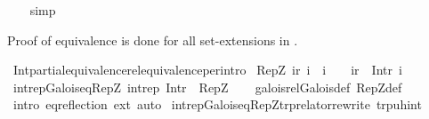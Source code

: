\begin{isabellebody}
%
\isadelimproof
\ \ %
\endisadelimproof
%
\isatagproof
{}\isamarkupfalse%
\ simp%
\endisatagproof
{\isafoldproof}%
%
\isadelimproof
%
\endisadelimproof
%
\begin{isamarkuptext}%
Proof of equivalence is done for all set-extensions in
.%
\end{isamarkuptext}\isamarkuptrue%
\isamarkupfalse%
\ Int{\isachardot}{\kern0pt}partial{\isacharunderscore}{\kern0pt}equivalence{\isacharunderscore}{\kern0pt}rel{\isacharunderscore}{\kern0pt}equivalence{\isacharbrackleft}{\kern0pt}per{\isacharunderscore}{\kern0pt}intro{\isacharbrackright}{\kern0pt}\isanewline
\isanewline
{}\isamarkupfalse%
\ {\isachardoublequoteopen}RepZ\ ir\ i\ {\isasymequiv}\ i\ {\isasymin}\ {\isasymint}\ {\isasymand}\ ir\ {\isacharequal}{\kern0pt}\ Int{\isachardot}{\kern0pt}r\ i{\isachardoublequoteclose}\isanewline
\isanewline
{}\isamarkupfalse%
\ int{\isacharunderscore}{\kern0pt}rep{\isacharunderscore}{\kern0pt}Galois{\isacharunderscore}{\kern0pt}eq{\isacharunderscore}{\kern0pt}RepZ{\isacharcolon}{\kern0pt}\ {\isachardoublequoteopen}{\isacharparenleft}{\kern0pt}\isactrlbsub {\isacharparenleft}{\kern0pt}{\isacharequal}{\kern0pt}\isactrlbsub int{\isacharunderscore}{\kern0pt}rep\isactrlesub {\isacharparenright}{\kern0pt}\isactrlesub {\isasymlessapprox}\isactrlbsub {\isacharparenleft}{\kern0pt}{\isacharequal}{\kern0pt}\isactrlbsub {\isasymint}\isactrlesub {\isacharparenright}{\kern0pt}\ Int{\isachardot}{\kern0pt}r\isactrlesub {\isacharparenright}{\kern0pt}\ {\isasymequiv}\ RepZ{\isachardoublequoteclose}\isanewline
%
\isadelimproof
\ \ %
\endisadelimproof
%
\isatagproof
{}\isamarkupfalse%
\ galois{\isacharunderscore}{\kern0pt}rel{\isachardot}{\kern0pt}Galois{\isacharunderscore}{\kern0pt}def\ RepZ{\isacharunderscore}{\kern0pt}def\ \isamarkupfalse%
\ {\isacharparenleft}{\kern0pt}intro\ eq{\isacharunderscore}{\kern0pt}reflection\ ext{\isacharparenright}{\kern0pt}\ auto%
\endisatagproof
{\isafoldproof}%
%
\isadelimproof
\isanewline
%
\endisadelimproof
\isanewline
{}\isamarkupfalse%
\ int{\isacharunderscore}{\kern0pt}rep{\isacharunderscore}{\kern0pt}Galois{\isacharunderscore}{\kern0pt}eq{\isacharunderscore}{\kern0pt}RepZ{\isacharbrackleft}{\kern0pt}trp{\isacharunderscore}{\kern0pt}relator{\isacharunderscore}{\kern0pt}rewrite{\isacharcomma}{\kern0pt}\ trp{\isacharunderscore}{\kern0pt}uhint{\isacharbrackright}{\kern0pt}%

\end{isabellebody}
